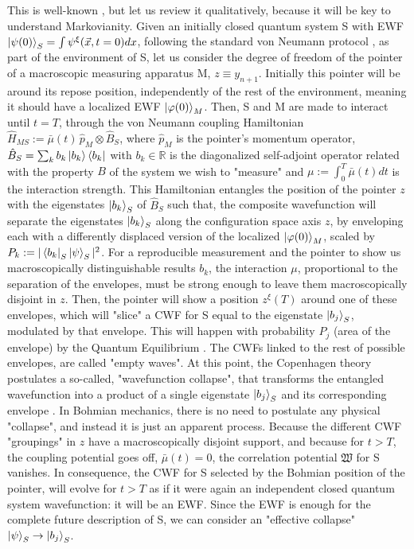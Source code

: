 \documentclass[11pt, a4paper]{article} %
\newcommand{\R}{\mathbb{R}} %
\begin{document}
This is well-known \cite{Durr, Absolute, operatorsObservables}, but let us review it qualitatively, because it will be key to understand Markovianity. Given an initially closed quantum system S with EWF $\ket{\psi(0)}_S=\int\psi^\xi(\vec{x},t=0)dx$, following the standard von Neumann protocol \cite{vonNeumann}, as part of the environment of S, let us consider the degree of freedom of the pointer of a macroscopic measuring apparatus M, $z\equiv y_{n+1}$. Initially this pointer will be around its repose position, independently of the rest of the environment, meaning it should have a localized EWF $\ket{\varphi(0)}_M$. Then, S and M are made to interact until $t=T$, through the von Neumann coupling Hamiltonian $\hat{H}_{MS}:=\bar{\mu}(t)\,\hat{p}_M\otimes \hat{B}_S$, where $\hat{p}_M$ is the pointer's momentum operator, $\hat{B}_S=\sum_kb_k\ket{b_k}\bra{b_k}$ with $b_k\in\R$ is the diagonalized self-adjoint operator related with the property $B$ of the system we wish to "measure" and $\mu:=\int_0^T\bar{\mu}(t)dt$ is the interaction strength. This Hamiltonian entangles the position of the pointer $z$ with the eigenstates $\ket{b_k}_S$ of $\hat{B}_S$ such that, the composite wavefunction will separate the eigenstates $\ket{b_k}_S$ along the configuration space axis $z$, by enveloping each with a differently displaced version of the localized $\ket{\varphi(0)}_M$, scaled by $P_k:=|\bra{b_k}_S\ket{\psi}_S|^2$. For a reproducible measurement \cite{operatorsObservables} and the pointer to show us macroscopically distinguishable results $b_k$, the interaction $\mu$, proportional to the separation of the envelopes, must be strong enough to leave them macroscopically disjoint in $z$. Then, the pointer will show a position $z^\xi(T)$ around one of these envelopes, which will "slice" a CWF for S equal to the eigenstate $\ket{b_j}_S$, modulated by that envelope. This will happen with probability $P_j$ (area of the envelope) by the Quantum Equilibrium \cite{Absolute}. The CWFs linked to the rest of possible envelopes, are called "empty waves". At this point, the Copenhagen theory postulates a so-called, "wavefunction collapse", that transforms the entangled wavefunction into a product of a single eigenstate $\ket{b_j}_S$ and its corresponding envelope \cite{vonNeumann}. In Bohmian mechanics, there is no need to postulate any physical "collapse", and instead it is just an apparent process. Because the different CWF "groupings" in $z$ have a macroscopically disjoint support, and because for $t>T$, the coupling potential goes off, $\bar{\mu}(t)=0$, the correlation potential $\mathfrak{W}$ for S vanishes. In consequence, the CWF for S selected by the Bohmian position of the pointer, will evolve for $t>T$ as if it were again an independent closed quantum system wavefunction: it will be an EWF. Since the EWF is enough for the complete future description of S, we can consider an "effective collapse" $\ket{\psi}_S\rightarrow\ket{b_j}_S$.
\end{document}
